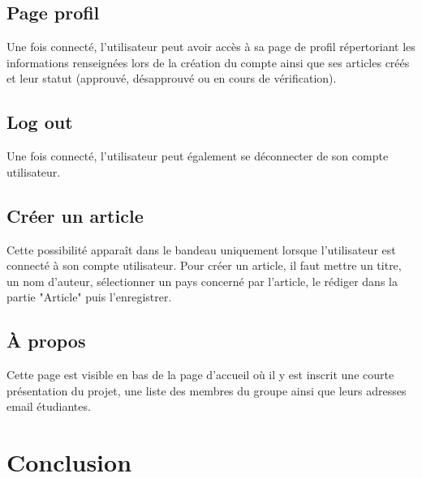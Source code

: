 \documentclass[12pt,a4paper]{report}
\begin{document}
\section{Page profil}
Une fois connecté, l'utilisateur peut avoir accès à sa page de profil répertoriant les informations renseignées lors de la création du compte ainsi que ses articles créés et leur statut (approuvé, désapprouvé ou en cours de vérification).

\section{Log out}
Une fois connecté, l'utilisateur peut également se déconnecter de son compte utilisateur.

\section{Créer un article}
Cette possibilité apparaît dans le bandeau uniquement lorsque l'utilisateur est connecté à son compte utilisateur. Pour créer un article, il faut mettre un titre, un nom d'auteur, sélectionner un pays concerné par l'article, le rédiger dans la partie "Article" puis l'enregistrer.

\section{À propos}
Cette page est visible en bas de la page d'accueil où il y est inscrit une courte présentation du projet, une liste des membres du groupe ainsi que leurs adresses email étudiantes.

\chapter{Conclusion}
\end{document}
